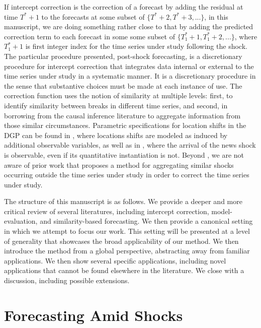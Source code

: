 \documentclass[11pt]{article}
\theoremstyle{definition}
\begin{document}
If intercept correction is the correction of a forecast by adding the residual at time $T^{*}+1$ to the forecasts at some subset of $\{T^{*}+2,T^{*}+3,...\}$, in this manuscript, we are doing something rather close to that by adding the predicted correction term to each forecast in some some subset of $\{T_{1}^{*}+1,T_{1}^{*}+2,...\}$, where $T^{*}_{1}+1$ is first integer index for the time series under study following the shock. 
The particular procedure presented, post-shock forecasting, is a discretionary procedure for intercept correction that integrates data internal or external to the time series under study in a systematic manner.  It is a discretionary procedure in the sense that substantive choices must be made at each instance of use.  The correction function uses the notion of similarity at multiple levels: first, to identify similarity between breaks in different time series, and second, in borrowing from the causal inference literature to aggregate information from those similar circumstances.  Parametric specifications for location shifts in the DGP can be found in \cite{castle2011forecasting}, where locations shifts are modeled as induced by additional observable variables, as well as in \cite{lundquist2024volatility}, where the arrival of the news shock is observable, even if its quantitative instantiation is not.  Beyond \cite{lin2021minimizing,lundquist2024volatility}, we are not aware of prior work that proposes a method for aggregating similar shocks occurring outside the time series under study in order to correct the time series under study.


The structure of this manuscript is as follows.  We provide a deeper and more critical review of several literatures, including intercept correction, model-evaluation, and similarity-based forecasting.  We then provide a canonical setting in which we attempt to focus our work.  This setting will be presented at a level of generality that showcases the broad applicability of our method.  We then introduce the method from a global perspective, abstracting away from familiar applications.  We then show several specific applications, including novel applications that cannot be found elsewhere in the literature.  We close with a discussion, including possible extensions.

 \section{Forecasting Amid Shocks}
\end{document}
